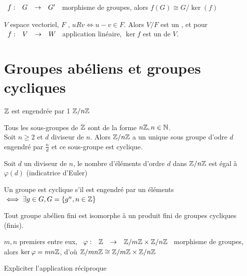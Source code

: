 \documentclass[]{report}
\begin{document}
    \begin{cor}{}{}
        $\begin{array}{ccccc} f : & G & \to & G' \end{array}$ morphisme de groupes, alors $f(G)\cong G/\ker(f)$
    \end{cor}

    \begin{re}{}{}
        $V$ espace vectoriel, $F$ \sev, $uRv\iff u-v\in F$. Alors $V/F$ est un \sev, et pour $\begin{array}{ccccc} f : & V & \to & W \end{array}$ application linéaire, $\ker f$ est un \sev de $V$.
    \end{re}

    \section{Groupes abéliens et groupes cycliques}

    \begin{ex}{}{}
        $\mathbb{Z}$ est engendrée par 1
        $\mathbb{Z}/n\mathbb{Z}$
    \end{ex}

    \begin{tm}{}{}
        Tous les sous-groupes de $\mathbb{Z}$ sont de la forme $n\mathbb{Z},n\in\mathbb{N}$.\\
        Soit $n\ge 2$ et $d$ diviseur de $n$. Alors $\mathbb{Z}/n\mathbb{Z}$ a un unique sous groupe d'odre $d$ engendré par $\frac{n}{d}$ et ce sous-groupe est cyclique.
    \end{tm}

    \begin{cor}{}{}
        Soit $d$ un diviseur de $n$, le nombre d'éléments d'ordre $d$ dans $\mathbb{Z}/n\mathbb{Z}$ est égal à $\varphi(d)$ (indicatrice d'Euler)
    \end{cor}

    \begin{df}{}{}
        Un groupe est cyclique s'il est engendré par un éléments $\iff \exists g\in G, G=\{g^n,n\in\mathbb{Z}\}$
    \end{df}

    \begin{tm}{}{}
        Tout groupe abélien fini est isomorphe à un produit fini de groupes cycliques (finis).
    \end{tm}

    \begin{tm}{}{}
        $m,n$ premiers entre eux, $\begin{array}{ccccc} \varphi : & \mathbb{Z} & \to & \mathbb{Z}/m\mathbb{Z}\times\mathbb{Z}/n\mathbb{Z} \end{array}$ morphisme de groupes, alors $\ker\varphi=mn\mathbb{Z}$, d'où $\mathbb{Z}/mn\mathbb{Z}\cong\mathbb{Z}/m\mathbb{Z}\times\mathbb{Z}/n\mathbb{Z}$
    \end{tm}

    \begin{exo}{}{}
        Expliciter l'application réciproque
    \end{exo}
\end{document}

